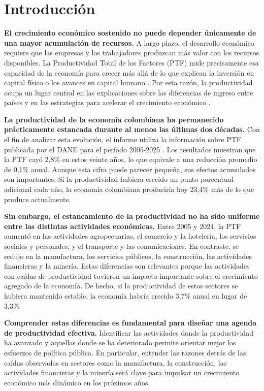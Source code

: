\section{Introducción}

\textbf{El crecimiento económico sostenido no puede depender únicamente de una mayor acumulación de recursos.} A largo plazo, el desarrollo económico requiere que las empresas y los trabajadores produzcan más valor con los recursos disponibles. La Productividad Total de los Factores (PTF) mide precisamente esa capacidad de la economía para crecer más allá de lo que explican la inversión en capital físico o los avances en capital humano \citep{Solow1956,MankiwRomerWeil1992,McQuinnWhelan2006}. Por esta razón, la productividad ocupa un lugar central en las explicaciones sobre las diferencias de ingreso entre países y en las estrategias para acelerar el crecimiento económico \citep{KlenowRodriguezClare1997,HallJones1999,EasterlyLevine2001}.

\textbf{La productividad de la economía colombiana ha permanecido prácticamente estancada durante al menos las últimas dos décadas.} Con el fin de analizar esta evolución, el informe utiliza la información sobre PTF publicada por el DANE para el período 2005-2025 \citep{DANE2025Annex,DANE2026Bulletin}. Los resultados muestran que la PTF cayó 2,8\% en estos veinte años, lo que equivale a una reducción promedio de 0,1\% anual. Aunque esta cifra puede parecer pequeña, sus efectos acumulados son importantes. Si la productividad hubiera crecido un punto porcentual adicional cada año, la economía colombiana produciría hoy 23,4\% más de lo que produce actualmente.

\textbf{Sin embargo, el estancamiento de la productividad no ha sido uniforme entre las distintas actividades económicas.} Entre 2005 y 2024, la PTF aumentó en las actividades agropecuarias, el comercio y la hotelería, los servicios sociales y personales, y el transporte y las comunicaciones. En contraste, se redujo en la manufactura, los servicios públicos, la construcción, las actividades financieras y la minería. Estas diferencias son relevantes porque las actividades con caídas de productividad tuvieron un impacto importante sobre el crecimiento agregado de la economía. De hecho, si la productividad de estos sectores se hubiera mantenido estable, la economía habría crecido 3,7\% anual en lugar de 3,3\%.

\textbf{Comprender estas diferencias es fundamental para diseñar una agenda de productividad efectiva.} Identificar las actividades donde la productividad ha avanzado y aquellas donde se ha deteriorado permite orientar mejor los esfuerzos de política pública. En particular, entender las razones detrás de las caídas observadas en sectores como la manufactura, la construcción, las actividades financieras y la minería será clave para impulsar un crecimiento económico más dinámico en los próximos años.

